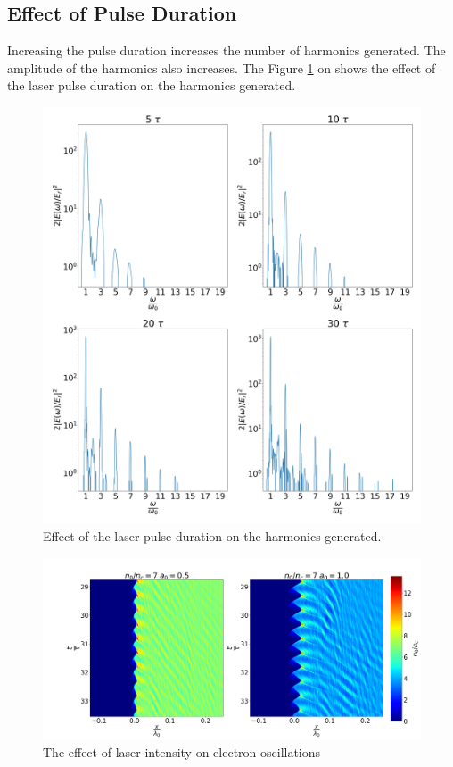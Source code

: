 \documentclass[12pt]{article}
\newenvironment{changemargin}[2]{
\begin{list}{}{
\setlength{\topsep}{0pt}
\setlength{\leftmargin}{#1}
\setlength{\rightmargin}{#2}
\setlength{\listparindent}{\parindent}
\setlength{\itemindent}{\parindent}
\setlength{\parsep}{\parskip}
}
\item[]}{\end{list}}
\begin{document}
\begin{changemargin}{-2cm}{-2cm}
    \subsection{Effect of Pulse Duration}
    Increasing the pulse duration increases the number of harmonics generated. The amplitude of the harmonics also increases. The Figure \ref{fig:pulse} on shows the effect of the laser pulse duration on the harmonics generated.
    \begin{figure}[t]
        \centering
        \includegraphics[width=1.0\textwidth, height=0.8\textwidth]{images/pulse.jpg}
        \caption{Effect of the laser pulse duration on the harmonics generated.}
        \label{fig:pulse}
    \end{figure}
    \begin{figure}[h]
        \centering
        \includegraphics[width=1.0\textwidth, height=0.8\textwidth]{images/oscillation1.jpg}
        \caption{The effect of laser intensity on electron oscillations}
        \label{fig:oscillation1}
    \end{figure}

\end{changemargin}
\end{document}
